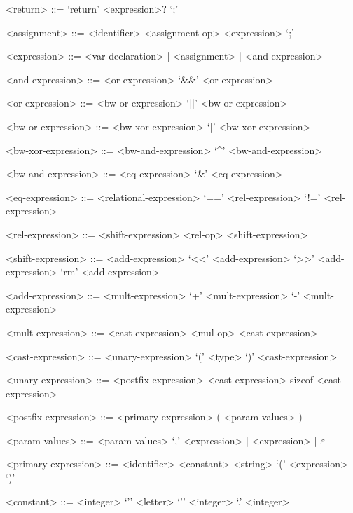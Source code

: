 \documentclass[
	article,			%
	11pt,				%
	oneside,			%
	a4paper,			%
	english,			%
	brazil,				%
	sumario=tradicional
	]{abntex2}
\begin{document}
\begin{grammar}
	<return> ::= `return' <expression>? `;'
	
	<assignment> ::= <identifier> <assignment-op> <expression> `;'
	
	<expression> ::= <var-declaration> | <assignment> | <and-expression>
	
	<and-expression> ::= <or-expression>
	\alt <and-expression> `&&' <or-expression>
	
	<or-expression> ::= <bw-or-expression>
	\alt <or-expression> `||' <bw-or-expression>
	
	<bw-or-expression> ::= <bw-xor-expression>
	\alt <bw-or-expression> `|' <bw-xor-expression>
	
	<bw-xor-expression> ::= <bw-and-expression>
	\alt <bw-xor-expression> `^' <bw-and-expression>
	
	<bw-and-expression> ::= <eq-expression>
	\alt <bw-and-expression> `&' <eq-expression>
	
	<eq-expression> ::= <relational-expression>
	\alt <eq-expression> `==' <rel-expression>
	\alt <eq-expression> `!=' <rel-expression>
	
	<rel-expression> ::= <shift-expression>
	\alt <rel-expression> <rel-op> <shift-expression>
	
	<shift-expression> ::= <add-expression>
	\alt <shift-expression> `<<' <add-expression>
	\alt <shift-expression> `>>' <add-expression>
	\alt <shift-expression> `rm' <add-expression>
	
	<add-expression> ::= <mult-expression>
	\alt <add-expression> `+' <mult-expression>
	\alt <add-expression> `-' <mult-expression>
	
	<mult-expression> ::= <cast-expression>
	\alt <mult-expression> <mul-op> <cast-expression>
	
	<cast-expression> ::= <unary-expression>
	\alt `(' <type> `)' <cast-expression>
	
	<unary-expression> ::= <postfix-expression>
	\alt <unary-op> <cast-expression>
	\alt sizeof <cast-expression>
	
	<postfix-expression> ::= <primary-expression>
	\alt <postfix-expression> ( <param-values> )
		
	<param-values> ::= <param-values> `,' <expression> | <expression> | $\varepsilon$
	
	<primary-expression> ::= <identifier>
	\alt <constant>
	\alt <string>
	\alt `(' <expression> `)'
	
	<constant> ::= <integer>
	\alt `'' <letter> `''
	\alt <integer> `.' <integer>
	

\end{grammar}
\end{document}
